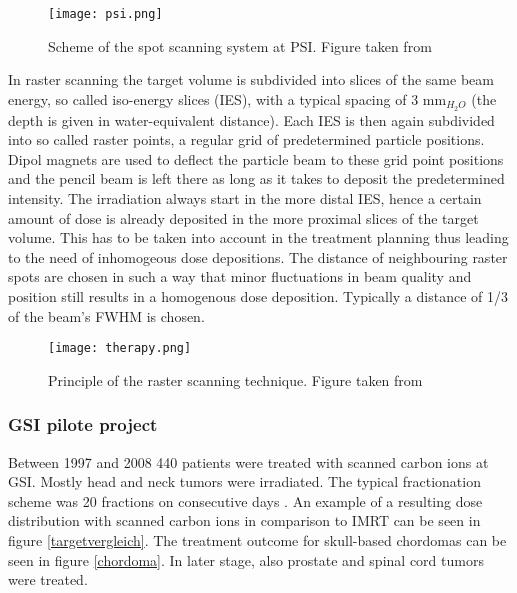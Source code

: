 \documentclass[type=dr, dr=rernat, accentcolor=tud7b,colorbacktitle, bigchapter, openright, twoside, 12pt ]{tudthesis}
\begin{document}
\begin{figure}[H]
\begin{center}
\texttt{[image: psi.png]}
\caption{Scheme of the spot scanning system at PSI. Figure taken from \cite{Ped95}}
\label{psi}
\end{center}
\end{figure}


In raster scanning the target volume is subdivided into slices of the same beam energy, so called iso-energy slices (IES), with a typical 
spacing of 3 mm$_{H_{2}O}$ (the depth is given in water-equivalent distance). Each IES is then again subdivided into so called raster points, 
a regular grid of predetermined particle positions. Dipol magnets are used to deflect the particle beam to these grid point positions and 
the pencil beam is left there as long as it takes to deposit the predetermined intensity. The irradiation always start in the more distal 
IES, hence a certain amount of dose is already deposited in the more proximal slices of the target volume. This has to be taken into account 
in the treatment planning thus leading to the need of inhomogeous dose depositions. The distance of neighbouring raster spots are chosen in 
such a way that minor fluctuations in beam quality and position still results in a homogenous dose deposition. Typically a distance of 1/3 
of the beam's FWHM is chosen. 

\begin{figure}[H]
\begin{center}
\texttt{[image: therapy.png]}
\caption{Principle of the raster scanning technique. Figure taken from \cite{Inf05}}
\label{scannign}
\end{center}
\end{figure}

\subsubsection*{GSI pilote project}

Between 1997 and 2008 440 patients were treated with scanned carbon ions at GSI. Mostly head and neck tumors were irradiated. 
The typical fractionation scheme was 20 fractions on consecutive days \cite{Lue12}. An example of a resulting 
dose distribution with scanned carbon ions in comparison to IMRT can be seen in figure \ref{targetvergleich}. 
The treatment outcome for skull-based chordomas can be seen in figure \ref{chordoma}. In later stage, also prostate and spinal cord 
tumors were treated.
\end{document}
